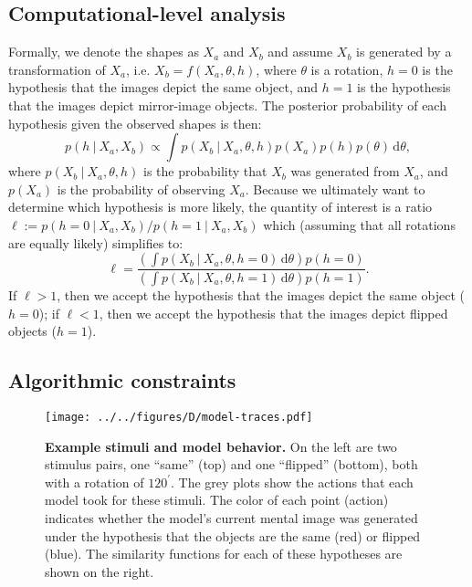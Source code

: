 \documentclass[10pt,letterpaper]{article}
\newcommand{\hi}[0]{h=0}
\newcommand{\hf}[0]{h=1}
\newcommand{\dif}[0]{\,\mathrm{d}}
\begin{document}
\subsection{Computational-level analysis}

Formally, we denote the shapes as $X_a$ and $X_b$ and assume $X_b$ is
generated by a transformation of $X_a$, i.e. $X_b=f(X_a, \theta, h)$,
where $\theta$ is a rotation, $\hi$ is the hypothesis that the images
depict the same object, and $\hf$ is the hypothesis that the images
depict mirror-image objects. The posterior probability of each
hypothesis given the observed shapes is then:
\begin{equation}
  p(h\ \vert\ X_a, X_b) \propto \int p(X_b\ \vert\ X_a, \theta, h)p(X_a)p(h)p(\theta)\dif\theta,
  \label{eq:posterior}
\end{equation}
where $p(X_b\ \vert\ X_a, \theta, h)$ is the probability that $X_b$
was generated from $X_a$, and $p(X_a)$ is the probability of observing
$X_a$. Because we ultimately want to determine which hypothesis is
more likely, the quantity of interest is a ratio $\ell:=p(\hi\ \vert\
X_a, X_b) / p(\hf\ \vert\ X_a, X_b)$ which (assuming that all
rotations are equally likely) simplifies to:
\begin{equation}
  \ell = \frac{\left(\int p(X_b\ \vert\ X_a, \theta, \hi)\dif\theta\right)p(\hi)}{\left(\int p(X_b\ \vert\ X_a, \theta, \hf)\dif\theta\right)p(\hf)}.
  \label{eq:lh-ratio}
\end{equation}
If $\ell > 1$, then we accept the hypothesis that the images depict
the same object ($\hi$); if $\ell < 1$, then we accept the hypothesis
that the images depict flipped objects ($\hf$).

\subsection{Algorithmic constraints}

\begin{figure*}[t]
  \begin{center}
    \texttt{[image: ../../figures/D/model-traces.pdf]}
    \caption{\textbf{Example stimuli and model behavior.} On the left
      are two stimulus pairs, one ``same'' (top) and one ``flipped''
      (bottom), both with a rotation of $120^\prime$. The grey plots
      show the actions that each model took for these stimuli. The
      color of each point (action) indicates whether the model's
      current mental image was generated under the hypothesis that the
      objects are the same (red) or flipped (blue). The similarity
      functions for each of these hypotheses are shown on the right.}
    \label{fig:model-traces}
  \end{center}
\end{figure*}
\end{document}
